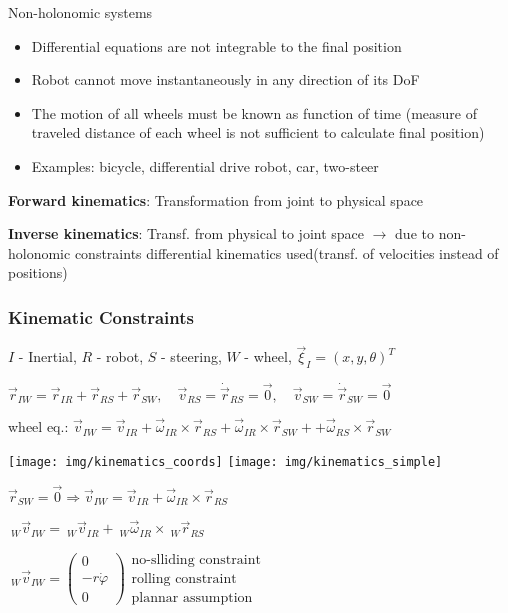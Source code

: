 \documentclass[fontsize=6pt]{scrartcl}
\begin{document}
\begin{multicols*}{4}
Non-holonomic systems
\begin{itemize}
	\item Differential equations are not integrable to the final position
	\item Robot cannot move instantaneously in any direction of its DoF
	\item The motion of all wheels must be known as function of time (measure of traveled distance of each wheel is not sufficient to calculate final position)
	\item Examples: bicycle, differential drive robot, car, two-steer
\end{itemize}

\textbf{Forward kinematics}: Transformation from joint to physical space

\textbf{Inverse kinematics}: Transf. from physical to joint space
$\rightarrow$ due to non-holonomic constraints differential kinematics used(transf. of velocities instead of positions)

\subsubsection*{Kinematic Constraints}
$I$ - Inertial, $R$ - robot, $S$ - steering, $W$ - wheel, $\vec{\xi}_I = (x, y, \theta)^T$

$ \vec r_{IW} = \vec r_{IR} +\vec r_{RS} + \vec r_{SW},\quad \vec v_{RS} = \dot{\vec r}_{RS} = \vec{0}, \quad \vec v_{SW} = \dot{\vec r}_{SW} = \vec{0} $

wheel eq.: $ \vec v_{IW} = \vec v_{IR} + \vec{\omega}_{IR} \times \vec r_{RS} + \vec{\omega}_{IR} \times \vec r_{SW} + + \vec{\omega}_{RS} \times \vec r_{SW}$

\begin{minipage}{0.27\linewidth}
	\texttt{[image: img/kinematics\_coords]}
	\texttt{[image: img/kinematics\_simple]}
\end{minipage}
\begin{minipage}{0.73\linewidth}
$ \vec r_{SW} = \vec 0 \Rightarrow \vec v_{IW} = \vec v_{IR} + \vec{\omega}_{IR} \times \vec r_{RS}$

$ ~_W\vec v_{IW} = ~_W\vec v_{IR} + ~_W\vec{\omega}_{IR} \times ~_W\vec r_{RS}$

$ ~_W\vec v_{IW} =
\begin{pmatrix}
0\\ -r\dot{\varphi}\\0
\end{pmatrix}
\begin{matrix}
\text{no-slliding constraint}\\
\text{rolling constraint}\\
\text{plannar assumption}
\end{matrix}
$


\end{minipage}
\end{multicols*}
\end{document}
